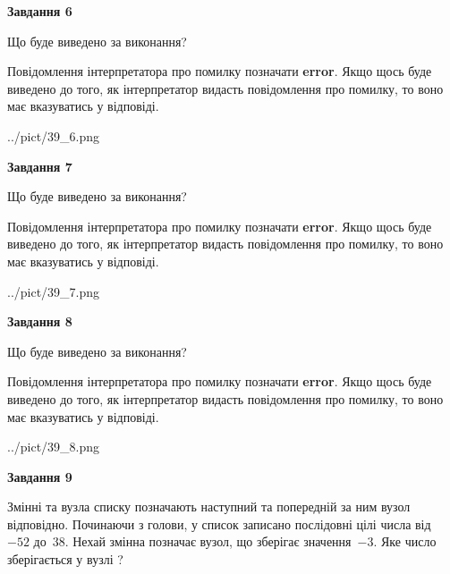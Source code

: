 \documentclass[12pt, ukrainian]{article}
\begin{document}
{\begin {large}
{\begin {center}\textbf{Завдання 6}\end {center}}\par
Що буде виведено за виконання?

Повідомлення інтерпретатора про помилку позначати \textbf{error}.
Якщо щось буде виведено до того, як інтерпретатор видасть повідомлення про помилку, 
то воно має вказуватись у відповіді. \par


\begin{center}
	{../pict/39_6.png}
\end{center}
\newpage

{\begin {center}\textbf{Завдання 7}\end {center}}\par
Що буде виведено за виконання?

Повідомлення інтерпретатора про помилку позначати \textbf{error}.
Якщо щось буде виведено до того, як інтерпретатор видасть повідомлення про помилку, 
то воно має вказуватись у відповіді. \par


\begin{center}
	{../pict/39_7.png}
\end{center}
\newpage

{\begin {center}\textbf{Завдання 8}\end {center}}\par
Що буде виведено за виконання?

Повідомлення інтерпретатора про помилку позначати \textbf{error}.
Якщо щось буде виведено до того, як інтерпретатор видасть повідомлення про помилку, 
то воно має вказуватись у відповіді. \par


\begin{center}
	{../pict/39_8.png}
\end{center}
\newpage

{\begin {center}\textbf{Завдання 9}\end {center}}\par
Змінні  та  вузла списку позначають наступний та попередній за ним вузол відповідно. Починаючи з голови, у список записано послідовні цілі числа від~$-52$ до~$38$. Нехай змінна  позначає вузол, що зберігає значення~$-3$.
Яке число зберігається у вузлі  ?\par
\newpage


\end{large}}
\end{document}

